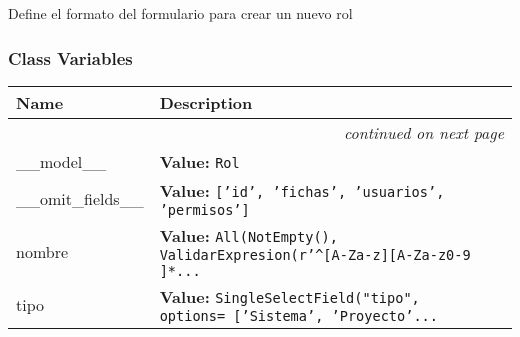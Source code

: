 Define el formato del formulario para crear un nuevo rol



  \subsubsection{Class Variables}

    \vspace{-1cm}
\hspace{\varindent}\begin{longtable}{|p{\varnamewidth}|p{\vardescrwidth}|l}
\cline{1-2}
\cline{1-2} \centering \textbf{Name} & \centering \textbf{Description}& \\
\cline{1-2}
\endhead\cline{1-2}\multicolumn{3}{r}{\small\textit{continued on next page}}\\\endfoot\cline{1-2}
\endlastfoot\raggedright \_\-\_\-m\-o\-d\-e\-l\-\_\-\_\- & \raggedright \textbf{Value:} 
{\tt Rol}&\\
\cline{1-2}
\raggedright \_\-\_\-o\-m\-i\-t\-\_\-f\-i\-e\-l\-d\-s\-\_\-\_\- & \raggedright \textbf{Value:} 
{\tt ['id', 'fichas', 'usuarios', 'permisos']}&\\
\cline{1-2}
\raggedright n\-o\-m\-b\-r\-e\- & \raggedright \textbf{Value:} 
{\tt All(NotEmpty(), ValidarExpresion(r'{\textasciicircum}[A-Za-z][A-Za-z0-9 ]*\texttt{...}}&\\
\cline{1-2}
\raggedright t\-i\-p\-o\- & \raggedright \textbf{Value:} 
{\tt SingleSelectField("tipo", options= ['Sistema', 'Proyecto'\texttt{...}}&\\
\cline{1-2}
\end{longtable}



